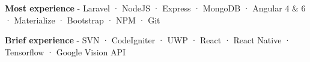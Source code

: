 \begin{cventries}
{\begin{cvitems}
        \item {\textbf{Most experience} \hspace{0.03cm} - \hspace{0.03cm} Laravel \hspace{0.03cm} · \hspace{0.03cm} NodeJS \hspace{0.03cm} · \hspace{0.03cm} Express \hspace{0.03cm} · \hspace{0.03cm} MongoDB \hspace{0.03cm} · \hspace{0.03cm} Angular 4 \& 6 \hspace{0.03cm} · \hspace{0.03cm} Materialize \hspace{0.03cm} · \hspace{0.03cm} Bootstrap \hspace{0.03cm} · \hspace{0.03cm} NPM \hspace{0.03cm} · \hspace{0.03cm} Git} %
        \item {\textbf{Brief experience} \hspace{0.03cm} - \hspace{0.03cm} SVN \hspace{0.03cm} · \hspace{0.03cm} CodeIgniter \hspace{0.03cm} · \hspace{0.03cm} UWP \hspace{0.03cm} · \hspace{0.03cm} React \hspace{0.03cm} · \hspace{0.03cm} React Native \hspace{0.03cm} · \hspace{0.03cm} Tensorflow \hspace{0.03cm} · \hspace{0.03cm} Google Vision API } %
      \end{cvitems}
    }
\end{cventries}